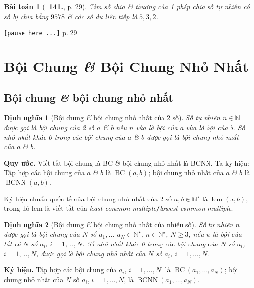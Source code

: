 \documentclass[oneside]{book}
\numberwithin{equation}{section}
\newtheorem{dinhnghia}{Định nghĩa}[section]
\newtheorem{baitoan}{Bài toán}[section]
\begin{document}
\begin{baitoan}[\cite{Binh_Toan_6_tap_1}, \textbf{141.}, p. 29]
	Tìm số chia \& thương của 1 phép chia số tự nhiên có số bị chia bằng $9578$ \& các số dư liên tiếp là $5,3,2$.
\end{baitoan}


\texttt{[pause here ...]} p. 29

\section{Bội Chung \textit{\&} Bội Chung Nhỏ Nhất}

\subsection{Bội chung \textit{\&} bội chung nhỏ nhất}

\begin{dinhnghia}[Bội chung \textit{\&} bội chung nhỏ nhất của 2 số]
	Số tự nhiên $n\in\mathbb{N}$ được gọi là \emph{bội chung} của 2 số $a$ \textit{\&} $b$ nếu $n$ vừa là bội của $a$ vừa là bội của $b$. Số nhỏ nhất khác 0 trong các bội chung của $a$ \textit{\&} $b$ được gọi là \emph{bội chung nhỏ nhất} của $a$ \textit{\&} $b$.
\end{dinhnghia}
\noindent\textbf{Quy ước.} Viết tắt bội chung là BC \textit{\&} bội chung nhỏ nhất là BCNN. Ta ký hiệu: Tập hợp các bội chung của $a$ \textit{\&} $b$ là $\operatorname{BC}(a,b)$; bội chung nhỏ nhất của $a$ \textit{\&} $b$ là $\operatorname{BCNN}(a,b)$.  

Ký hiệu chuẩn quốc tế của bội chung nhỏ nhất của 2 số $a,b\in\mathbb{N}^\star$ là $\operatorname{lcm}(a,b)$, trong đó lcm là viết tắt của \textit{least common multiple}\texttt{/}\textit{lowest common multiple}.

\begin{dinhnghia}[Bội chung \textit{\&} bội chung nhỏ nhất của nhiều số]
	Số tự nhiên $n$ được gọi là \emph{bội chung} của $N$ số $a_1,\ldots,a_N\in\mathbb{N}^\star$, $n\in\mathbb{N}^\star$, $N\ge 3$, nếu $n$ là bội của tất cả $N$ số $a_i$, $i = 1,\ldots,N$. Số nhỏ nhất khác 0 trong các bội chung của $N$ số $a_i$, $i = 1,\ldots,N$, được gọi là \emph{bội chung nhỏ nhất} của $N$ số $a_i$, $i = 1,\ldots,N$.
\end{dinhnghia}
\noindent\textbf{Ký hiệu.} Tập hợp các bội chung của $a_i$, $i = 1,\ldots,N$, là $\operatorname{BC}(a_1,\ldots,a_N)$; bội chung nhỏ nhất của $N$ số $a_i$, $i = 1,\ldots,N$, là $\operatorname{BCNN}(a_1,\ldots,a_N)$.
\end{document}
